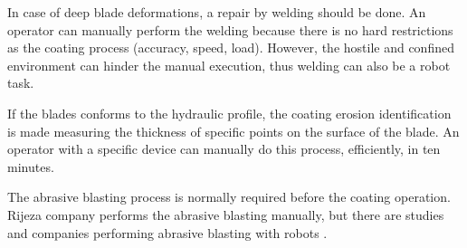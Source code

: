 In case of deep blade deformations, %
a repair by welding should be done. %
An operator can manually perform the welding because there is no hard
restrictions as the coating process (accuracy, speed, load). However, the
hostile and confined environment can hinder the manual execution, thus welding
can also be a robot task.

If the blades conforms to the hydraulic profile, the coating erosion
identification is made measuring the thickness of specific points on the
surface of the blade. An operator with a specific device can manually do this
process, efficiently, in ten minutes. %

The abrasive blasting process is normally required before the coating
operation. %
Rijeza company performs the abrasive blasting manually, but there are studies
and companies performing abrasive blasting with robots \citep{ren2008path}.


